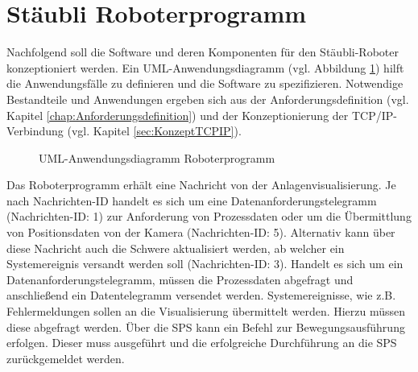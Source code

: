 \documentclass[ a4paper,
                oneside,
                toc=bibliography,
                toc=listof
                ]{scrbook}
\begin{document}
	\newpage
	\section{Stäubli Roboterprogramm}
	\label{sec:KonzeptVAL3}
	Nachfolgend soll die Software und deren Komponenten für den Stäubli-Roboter konzeptioniert werden. Ein UML-Anwendungsdiagramm (vgl. Abbildung \ref{fig:UML_Use_Case_Robo}) hilft die Anwendungsfälle zu definieren und die Software zu spezifizieren. Notwendige Bestandteile und Anwendungen ergeben sich aus der Anforderungsdefinition (vgl. Kapitel \ref{chap:Anforderungsdefinition}) und der Konzeptionierung der TCP/IP-Verbindung (vgl. Kapitel \ref{sec:KonzeptTCPIP}).
	\begin{figure}[h!]
		\centering
		\caption{UML-Anwendungsdiagramm Roboterprogramm}
		\label{fig:UML_Use_Case_Robo}
	\end{figure}
	Das Roboterprogramm erhält eine Nachricht von der Anlagenvisualisierung. Je nach Nachrichten-ID handelt es sich um eine Datenanforderungstelegramm (Nachrichten-ID: 1) zur Anforderung von Prozessdaten oder um die Übermittlung von Positionsdaten von der Kamera (Nachrichten-ID: 5). Alternativ kann über diese Nachricht auch die Schwere aktualisiert werden, ab welcher ein Systemereignis versandt werden soll (Nachrichten-ID: 3). Handelt es sich um ein Datenanforderungstelegramm, müssen die Prozessdaten abgefragt und anschließend ein Datentelegramm versendet werden. Systemereignisse, wie z.B. Fehlermeldungen sollen an die Visualisierung übermittelt werden. Hierzu müssen diese abgefragt werden. Über die SPS kann ein Befehl zur Bewegungsausführung erfolgen. Dieser muss ausgeführt und die erfolgreiche Durchführung an die SPS zurückgemeldet werden.\\
\end{document}
